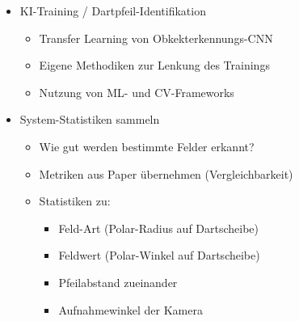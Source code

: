 \begin{itemize}
    \item KI-Training / Dartpfeil-Identifikation
    \begin{itemize}
        \item Transfer Learning von Obkekterkennungs-CNN
        \item Eigene Methodiken zur Lenkung des Trainings
        \item Nutzung von ML- und CV-Frameworks
    \end{itemize}

    \item System-Statistiken sammeln
    \begin{itemize}
        \item Wie gut werden bestimmte Felder erkannt?
        \item Metriken aus Paper übernehmen (Vergleichbarkeit)
        \item Statistiken zu:
        \begin{itemize}
            \item Feld-Art (Polar-Radius auf Dartscheibe)
            \item Feldwert (Polar-Winkel auf Dartscheibe)
            \item Pfeilabstand zueinander
            \item Aufnahmewinkel der Kamera
        \end{itemize}
    \end{itemize}
\end{itemize}
\fi
